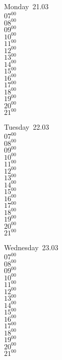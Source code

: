 \documentclass[11pt,a4paper]{book}\usepackage[]{graphicx}\usepackage[]{color}
\begin{document}
\begin{headerbox}
\end{headerbox}
\begin{weekdaybox}
  Monday~21.03\\
  { 
  \vfill
  $07^{00}$\\
$08^{00}$\\
$09^{00}$\\
$10^{00}$\\
$11^{00}$\\
$12^{00}$\\
$13^{00}$\\
$14^{00}$\\
$15^{00}$\\
$16^{00}$\\
$17^{00}$\\
$18^{00}$\\
$19^{00}$\\
$20^{00}$\\
$21^{00}$\\
  }
\end{weekdaybox}
\begin{weekdaybox}
  Tuesday~22.03\\
  { 
  \vfill
  $07^{00}$\\
$08^{00}$\\
$09^{00}$\\
$10^{00}$\\
$11^{00}$\\
$12^{00}$\\
$13^{00}$\\
$14^{00}$\\
$15^{00}$\\
$16^{00}$\\
$17^{00}$\\
$18^{00}$\\
$19^{00}$\\
$20^{00}$\\
$21^{00}$\\
  }
\end{weekdaybox}
\begin{weekdaybox}
  Wednesday~23.03\\
  { 
  \vfill
  $07^{00}$\\
$08^{00}$\\
$09^{00}$\\
$10^{00}$\\
$11^{00}$\\
$12^{00}$\\
$13^{00}$\\
$14^{00}$\\
$15^{00}$\\
$16^{00}$\\
$17^{00}$\\
$18^{00}$\\
$19^{00}$\\
$20^{00}$\\
$21^{00}$\\
  }
\end{weekdaybox}
\end{document}
